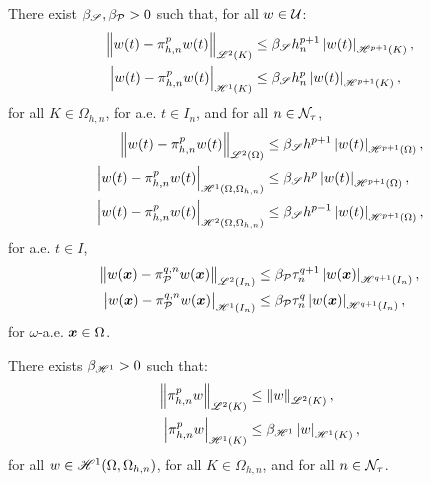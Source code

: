 \begin{lemma} %
    There exist $\beta_{\mathscr{S}}, \beta_{\mathcal{P}_{}} > 0$ such that, for all $w \in \mathcal{U}$:
    \begin{align}
        \left\lVert w(t) - \pi_{h, n}^p w(t) \right\rVert_{\mathscr{L}^{2}(K)} &\leq \beta_{\mathscr{S}} h_n^{p + 1} \left\lvert w(t) \right\rvert_{\mathscr{H}^{p + 1}(K)}, \\
        \left\lvert w(t) - \pi_{h, n}^p w(t) \right\rvert_{\mathscr{H}^{1}(K)} &\leq \beta_{\mathscr{S}} h_n^{p} \left\lvert w(t) \right\rvert_{\mathscr{H}^{p + 1}(K)},
    \end{align}
    for all $K \in \Omega_{h, n}$, for a.e. $t \in I_n$, and for all $n \in \mathcal{N}_{\tau}$,
    \begin{align}
        \left\lVert w(t) - \pi_{h, n}^p w(t) \right\rVert_{\mathscr{L}^{2}(\Omega)} &\leq \beta_{\mathscr{S}} h^{p + 1} \left\lvert w(t) \right\rvert_{\mathscr{H}^{p + 1}(\Omega)}, \\
        \left\lvert w(t) - \pi_{h, n}^p w(t) \right\rvert_{\mathscr{H}^{1}(\Omega, \Omega_{h, n})} &\leq \beta_{\mathscr{S}} h^{p} \left\lvert w(t) \right\rvert_{\mathscr{H}^{p + 1}(\Omega)}, \\
        \left\lvert w(t) - \pi_{h, n}^p w(t) \right\rvert_{\mathscr{H}^{2}(\Omega, \Omega_{h, n})} &\leq \beta_{\mathscr{S}} h^{p - 1} \left\lvert w(t) \right\rvert_{\mathscr{H}^{p + 1}(\Omega)},
    \end{align}
    for a.e. $t \in I$,
    \begin{align}
        \left\lVert w(\bm{x}) - \pi_{\mathcal{P}_{}}^{q, n} w(\bm{x}) \right\rVert_{\mathscr{L}^{2}(I_n)} &\leq \beta_{\mathcal{P}_{}} \tau_n^{q + 1} \left\lvert w(\bm{x}) \right\rvert_{\mathscr{H}^{q + 1}(I_n)}, \\
        \left\lvert w(\bm{x}) - \pi_{\mathcal{P}_{}}^{q, n} w(\bm{x}) \right\rvert_{\mathscr{H}^{1}(I_n)} &\leq \beta_{\mathcal{P}_{}} \tau_n^{q} \left\lvert w(\bm{x}) \right\rvert_{\mathscr{H}^{q + 1}(I_n)},
    \end{align}
    for $\omega$-a.e. $\bm{x} \in \Omega$.
\end{lemma}

\begin{lemma}
    There exists $\beta_{\mathscr{H}^{1}} > 0$ such that:
    \begin{align}
        \left\lVert \pi_{h, n}^p w \right\rVert_{\mathscr{L}^{2}(K)} &\leq \left\lVert w \right\rVert_{\mathscr{L}^{2}(K)}, \\
        \left\lvert \pi_{h, n}^p w \right\rvert_{\mathscr{H}^{1}(K)} &\leq \beta_{\mathscr{H}^{1}} \left\lvert w \right\rvert_{\mathscr{H}^{1}(K)},
    \end{align}
    for all $w \in \mathscr{H}^{1}(\Omega, \Omega_{h, n})$, for all $K \in \Omega_{h, n}$, and for all $n \in \mathcal{N}_{\tau}$.
\end{lemma}

